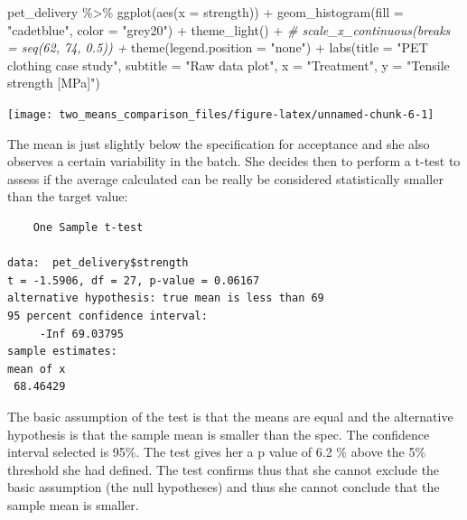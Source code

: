 \documentclass[
]{book}
\newenvironment{Shaded}{\begin{snugshade}}{\end{snugshade}}
\newcommand{\AttributeTok}[1]{\textcolor[rgb]{0.77,0.63,0.00}{#1}}
\newcommand{\CommentTok}[1]{\textcolor[rgb]{0.56,0.35,0.01}{\textit{#1}}}
\newcommand{\DecValTok}[1]{\textcolor[rgb]{0.00,0.00,0.81}{#1}}
\newcommand{\FunctionTok}[1]{\textcolor[rgb]{0.00,0.00,0.00}{#1}}
\newcommand{\NormalTok}[1]{#1}
\newcommand{\SpecialCharTok}[1]{\textcolor[rgb]{0.00,0.00,0.00}{#1}}
\newcommand{\StringTok}[1]{\textcolor[rgb]{0.31,0.60,0.02}{#1}}
\begin{document}
\begin{Shaded}
\begin{Highlighting}[]
\NormalTok{pet\_delivery }\SpecialCharTok{\%\textgreater{}\%} 
  \FunctionTok{ggplot}\NormalTok{(}\FunctionTok{aes}\NormalTok{(}\AttributeTok{x =}\NormalTok{ strength)) }\SpecialCharTok{+}
  \FunctionTok{geom\_histogram}\NormalTok{(}\AttributeTok{fill =} \StringTok{"cadetblue"}\NormalTok{, }
                 \AttributeTok{color =} \StringTok{"grey20"}\NormalTok{) }\SpecialCharTok{+}
  \FunctionTok{theme\_light}\NormalTok{() }\SpecialCharTok{+}
  \CommentTok{\# scale\_x\_continuous(breaks = seq(62, 74, 0.5)) +}
  \FunctionTok{theme}\NormalTok{(}\AttributeTok{legend.position =} \StringTok{"none"}\NormalTok{) }\SpecialCharTok{+}
  \FunctionTok{labs}\NormalTok{(}\AttributeTok{title =} \StringTok{"PET clothing case study"}\NormalTok{,}
       \AttributeTok{subtitle =} \StringTok{"Raw data plot"}\NormalTok{,}
       \AttributeTok{x =} \StringTok{"Treatment"}\NormalTok{,}
       \AttributeTok{y =} \StringTok{"Tensile strength [MPa]"}\NormalTok{)}
\end{Highlighting}
\end{Shaded}

\texttt{[image: two\_means\_comparison\_files/figure-latex/unnamed-chunk-6-1]}

The mean is just slightly below the specification for acceptance and she also observes a certain variability in the batch. She decides then to perform a t-test to assess if the average calculated can be really be considered statistically smaller than the target value:

\begin{Shaded}
\end{Shaded}

\begin{verbatim}
	One Sample t-test

data:  pet_delivery$strength
t = -1.5906, df = 27, p-value = 0.06167
alternative hypothesis: true mean is less than 69
95 percent confidence interval:
     -Inf 69.03795
sample estimates:
mean of x 
 68.46429 
\end{verbatim}

The basic assumption of the test is that the means are equal and the alternative hypothesis is that the sample mean is smaller than the spec. The confidence interval selected is 95\%. The test gives her a p value of 6.2 \% above the 5\% threshold she had defined. The test confirms thus that she cannot exclude the basic assumption (the null hypotheses) and thus she cannot conclude that the sample mean is smaller.
\end{document}
